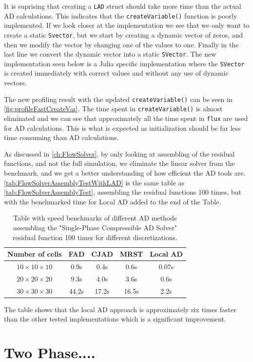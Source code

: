 It is suprising that creating a \texttt{LAD} struct should take more time than the actual AD calculations. This indicates that the \texttt{createVariable()} function is poorly implemented. If we look closer at the implementation we see that we only want to create a static \texttt{Svector}, but we start by creating a dynamic vector of zeros, and then we modify the vector by changing one of the values to one. Finally in the last line we convert the dynamic vector into a static \texttt{SVector}. The new implementation seen below is a Julia specific implementation where the \texttt{SVector} is created immediately with correct values and without any use of dynamic vectors.

The new profiling result with the updated \texttt{createVariable()} can be seen in \autoref{fig:profileFastCreateVar}. The time spent in \texttt{createVariable()} is almost eliminated and we can see that approximately all the time spent in \texttt{flux} are used for AD calculations. This is what is expected as initialization should be far less time consuming than AD calculations. 

As discussed in \autoref{ch:FlowSolver}, by only looking at assembling of the residual functions, and not the full simulation, we eliminate the linear solver from the benchmark, and we get a better understanding of how efficient the AD tools are. \autoref{tab:FlowSolverAssemblyTestWithLAD} is the same table as \autoref{tab:FlowSolverAssemblyTest}, assembling the residual functions 100 times, but with the benchmarked time for Local AD added to the end of the Table.
\begin{table}[htb]
    \centering
    \caption{Table with speed benchmarks of different AD methods assembling the "Single-Phase Compressible AD Solver" residual function 100 times for different discretizations.}
    \label{tab:FlowSolverAssemblyTestWithLAD}
    \def\arraystretch{1.5}
    \begin{tabular}{ccccc}
    \textbf{Number of cells} & \textbf{FAD} & \textbf{CJAD} & \textbf{MRST} & \textbf{Local AD}\\
        \hline
         $10\times10\times10$ & 0.9s & 0.4s & 0.6s & 0.07s \\  
         $20\times20\times20$ & 9.3s & 4.0s & 3.6s & 0.6s \\ 
         $30\times30\times30$ & 44.2s& 17.2s& 16.5s & 2.2s \\ \hline
    \end{tabular}
\end{table}
The table shows that the local AD approach is approximately six times faster than the other tested implementations which is a significant improvement. 

\section{Two Phase....}
\label{sec:TwoPhaseSimulation}

